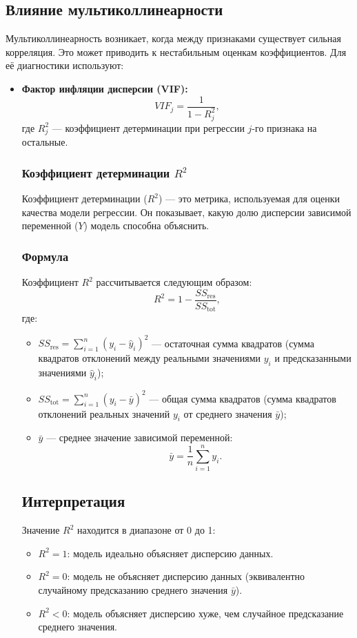 \subsection*{Влияние мультиколлинеарности}
Мультиколлинеарность возникает, когда между признаками существует сильная корреляция. Это может приводить к нестабильным оценкам коэффициентов. Для её диагностики используют:
\begin{itemize}
    \item \textbf{Фактор инфляции дисперсии (VIF):}
    \[
    VIF_j = \frac{1}{1 - R_j^2},
    \]
    где $R_j^2$ --- коэффициент детерминации при регрессии $j$-го признака на остальные.

    \subsubsection{Коэффициент детерминации \( R^2 \)}

    Коэффициент детерминации (\( R^2 \)) — это метрика, используемая для оценки качества модели регрессии. Он показывает, какую долю дисперсии зависимой переменной (\( Y \)) модель способна объяснить.

    \subsubsection*{Формула}
    Коэффициент \( R^2 \) рассчитывается следующим образом:
    \[
    R^2 = 1 - \frac{SS_{\text{res}}}{SS_{\text{tot}}},
    \]
    где:
    \begin{itemize}
    \item \( SS_{\text{res}} = \sum_{i=1}^n (y_i - \hat{y}_i)^2 \) — остаточная сумма квадратов (сумма квадратов отклонений между реальными значениями \( y_i \) и предсказанными значениями \( \hat{y}_i \));
    \item \( SS_{\text{tot}} = \sum_{i=1}^n (y_i - \bar{y})^2 \) — общая сумма квадратов (сумма квадратов отклонений реальных значений \( y_i \) от среднего значения \( \bar{y} \));
    \item \( \bar{y} \) — среднее значение зависимой переменной:
    \[
    \bar{y} = \frac{1}{n} \sum_{i=1}^n y_i.
    \]
\end{itemize}

\subsection*{Интерпретация}
Значение \( R^2 \) находится в диапазоне от 0 до 1:
\begin{itemize}
    \item \( R^2 = 1 \): модель идеально объясняет дисперсию данных.
    \item \( R^2 = 0 \): модель не объясняет дисперсию данных (эквивалентно случайному предсказанию среднего значения \( \bar{y} \)).
    \item \( R^2 < 0 \): модель объясняет дисперсию хуже, чем случайное предсказание среднего значения.
\end{itemize}


\end{itemize}
